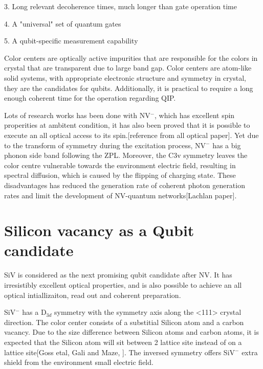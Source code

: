 3. Long relevant decoherence times, much longer than gate operation time

4. A "universal" set of quantum gates

5. A qubit-specific measurement capability

Color centers are optically active impurities that are responsible for the colors in crystal that are transparent due to large band gap. Color centers are atom-like solid systems, with appropriate electronic structure and symmetry in crystal, they are the candidates for qubits. Additionally, it is practical to require a long enough coherent time for the operation regarding QIP.

Lots of research works has been done with NV$^{-}$, which has excellent spin properities at ambitent condition, it has also been proved that it is possible to execute an all optical access to its spin.[reference from all optical paper]. Yet due to the transform of symmetry during the excitation process, NV$^{-}$ has a big phonon side band following the ZPL. Moreover, the C3v symmetry leaves the color centre vulnerable towards the environment electric field, resulting in spectral diffusion, which is caused by the flipping of charging state. These disadvantages has reduced the generation rate of coherent photon generation rates and limit the development of NV-quantum networks[Lachlan paper].

\section[Silicon vacancy as a Qubit candidate]{Silicon vacancy as a Qubit candidate}

SiV is considered as the next promising qubit candidate after NV. It has irresistibly excellent optical properties, and is also possible to achieve an all optical intiallizaiton, read out and coherent preparation.

SiV$^{-}$ has a D$_{3d}$ symmetry with the symmetry axis along the <111> crystal direction. The color center consists of a substitial Silicon atom and a carbon vacancy. Due to the size difference between Silicon atoms and carbon atoms, it is expected that the Silicon atom will sit between 2 lattice site instead of on a lattice site[Goss etal,  Gali and Maze, ]. The inversed symmetry offers SiV$^{-}$ extra shield from the environment small electric field.

